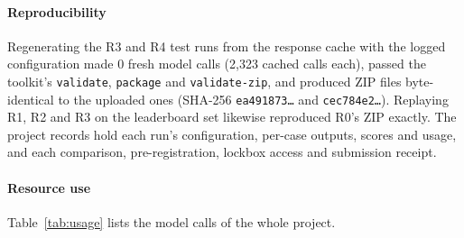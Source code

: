 \documentclass[conference]{IEEEtran}
\newcommand{\id}[1]{\texttt{#1}}
\begin{document}
\paragraph*{Reproducibility}
Regenerating the R3 and R4 test runs from the response cache with the logged configuration made 0 fresh model calls (2,323 cached calls each), passed the toolkit's \id{validate}, \id{package} and \id{validate-zip}, and produced ZIP files byte-identical to the uploaded ones (SHA-256 \id{ea491873\ldots} and \id{cec784e2\ldots}). Replaying R1, R2 and R3 on the leaderboard set likewise reproduced R0's ZIP exactly. The project records hold each run's configuration, per-case outputs, scores and usage, and each comparison, pre-registration, lockbox access and submission receipt.

\paragraph*{Resource use}
Table~\ref{tab:usage} lists the model calls of the whole project.
\end{document}
